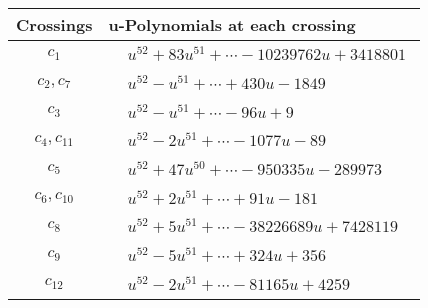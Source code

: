 \documentclass[1p]{elsarticle_modified}
\theoremstyle{definition}
\begin{document}
\begin{tabular}{m{50pt}|m{274pt}}
Crossings & \hspace{64pt}u-Polynomials at each crossing \\
\hline $$\begin{aligned}c_{1}\end{aligned}$$&$\begin{aligned}
&u^{52}+83 u^{51}+\cdots-10239762 u+3418801
\end{aligned}$\\
\hline $$\begin{aligned}c_{2},c_{7}\end{aligned}$$&$\begin{aligned}
&u^{52}- u^{51}+\cdots+430 u-1849
\end{aligned}$\\
\hline $$\begin{aligned}c_{3}\end{aligned}$$&$\begin{aligned}
&u^{52}- u^{51}+\cdots-96 u+9
\end{aligned}$\\
\hline $$\begin{aligned}c_{4},c_{11}\end{aligned}$$&$\begin{aligned}
&u^{52}-2 u^{51}+\cdots-1077 u-89
\end{aligned}$\\
\hline $$\begin{aligned}c_{5}\end{aligned}$$&$\begin{aligned}
&u^{52}+47 u^{50}+\cdots-950335 u-289973
\end{aligned}$\\
\hline $$\begin{aligned}c_{6},c_{10}\end{aligned}$$&$\begin{aligned}
&u^{52}+2 u^{51}+\cdots+91 u-181
\end{aligned}$\\
\hline $$\begin{aligned}c_{8}\end{aligned}$$&$\begin{aligned}
&u^{52}+5 u^{51}+\cdots-38226689 u+7428119
\end{aligned}$\\
\hline $$\begin{aligned}c_{9}\end{aligned}$$&$\begin{aligned}
&u^{52}-5 u^{51}+\cdots+324 u+356
\end{aligned}$\\
\hline $$\begin{aligned}c_{12}\end{aligned}$$&$\begin{aligned}
&u^{52}-2 u^{51}+\cdots-81165 u+4259
\end{aligned}$\\
\hline
\end{tabular}\\~\\
\end{document}
